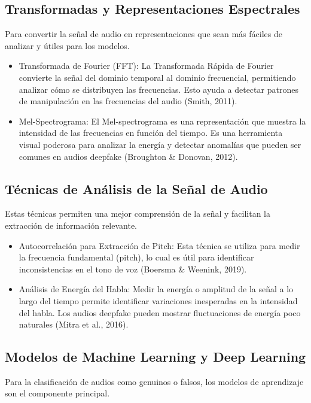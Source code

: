 \subsection{Transformadas y Representaciones Espectrales}

Para convertir la señal de audio en representaciones que sean más fáciles de analizar y útiles para los modelos.

\begin{itemize}
	\item Transformada de Fourier (FFT): La Transformada Rápida de Fourier convierte la señal del dominio temporal al dominio frecuencial, permitiendo analizar cómo se distribuyen las frecuencias. Esto ayuda a detectar patrones de manipulación en las frecuencias del audio (Smith, 2011).
	\item Mel-Spectrograma: El Mel-spectrograma es una representación que muestra la intensidad de las frecuencias en función del tiempo. Es una herramienta visual poderosa para analizar la energía y detectar anomalías que pueden ser comunes en audios deepfake (Broughton \& Donovan, 2012).
\end{itemize}



\subsection{Técnicas de Análisis de la Señal de Audio}
Estas técnicas permiten una mejor comprensión de la señal y facilitan la extracción de información relevante.

\begin{itemize}
	\item Autocorrelación para Extracción de Pitch: Esta técnica se utiliza para medir la frecuencia fundamental (pitch), lo cual es útil para identificar inconsistencias en el tono de voz (Boersma \& Weenink, 2019).
	\item Análisis de Energía del Habla: Medir la energía o amplitud de la señal a lo largo del tiempo permite identificar variaciones inesperadas en la intensidad del habla. Los audios deepfake pueden mostrar fluctuaciones de energía poco naturales (Mitra et al., 2016).
\end{itemize}

\subsection{Modelos de Machine Learning y Deep Learning}
Para la clasificación de audios como genuinos o falsos, los modelos de aprendizaje son el componente principal.

